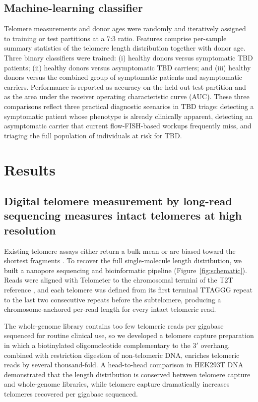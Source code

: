 \documentclass[11pt]{article}
\begin{document}
\subsection{Machine-learning classifier}

Telomere measurements and donor ages were randomly and iteratively
assigned to training or test partitions at a 7:3 ratio. Features
comprise per-sample summary statistics of the telomere length
distribution together with donor age. Three binary classifiers were
trained: (i) healthy donors versus symptomatic TBD patients; (ii)
healthy donors versus asymptomatic TBD carriers; and (iii) healthy
donors versus the combined group of symptomatic patients and
asymptomatic carriers. Performance is reported as accuracy on the
held-out test partition and as the area under the receiver operating
characteristic curve (AUC). These three comparisons reflect three
practical diagnostic scenarios in TBD triage: detecting a symptomatic
patient whose phenotype is already clinically apparent, detecting an
asymptomatic carrier that current flow-FISH-based workups frequently
miss, and triaging the full population of individuals at risk for TBD.

\section{Results}

\subsection{Digital telomere measurement by long-read sequencing measures intact telomeres at high resolution}

Existing telomere assays either return a bulk mean or are biased toward
the shortest fragments \citep{aubert2012telomere,baird2003extensive,lai2018comparison}.
To recover the full single-molecule length distribution, we built a
nanopore sequencing and bioinformatic pipeline (Figure~\ref{fig:schematic}).
Reads were aligned with Telometer to the chromosomal termini of the T2T
reference \citep{nurk2022complete}, and each telomere was defined from
its first terminal TTAGGG repeat to the last two consecutive repeats
before the subtelomere, producing a chromosome-anchored per-read length
for every intact telomeric read.

The whole-genome library contains too few telomeric reads per gigabase
sequenced for routine clinical use, so we developed a telomere capture
preparation in which a biotinylated oligonucleotide complementary to the
3$'$ overhang, combined with restriction digestion of non-telomeric DNA,
enriches telomeric reads by several thousand-fold. A head-to-head
comparison in HEK293T DNA demonstrated that the length distribution is
conserved between telomere capture and whole-genome libraries, while
telomere capture dramatically increases telomeres recovered per gigabase
sequenced.
\end{document}

